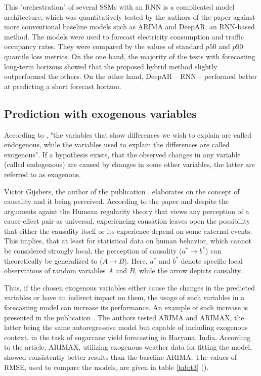 \documentclass[3p,times,procedia]{elsarticle}
\begin{document}
\begin{enumerate}
This "orchestration" of several SSMs with an RNN is a complicated model architecture, which was quantitatively tested by the authors of the paper \cite{rangapuram2018deep} against more conventional baseline models such as ARIMA and DeepAR, an RNN-based method. The models were used to forecast electricity consumption and traffic occupancy rates. They were compared by the values of standard $p50$ and $p90$ quantile loss metrics. On the one hand, the majority of the tests with forecasting long-term horizons showed that the proposed hybrid method slightly outperformed the others. On the other hand, DeepAR -- RNN -- performed better at predicting a short forecast horizon.
\end{enumerate}

\subsection{Prediction with exogenous variables} \label{pwev}

According to \cite{smelser2001international}, "the variables that show differences we wish to explain are called endogenous, while the variables used to explain the differences are  called exogenous". If a hypothesis exists, that the observed changes in any variable (called endogenous) are caused by changes in some other variables, the latter are referred to as exogenous.

Victor Gijsbers, the author of the publication \cite{gijsbers2021perceiving}, elaborates on the concept of causality and it being perceived. According to the paper and despite the arguments againt the Humean regularity theory that views any perception of a cause-effect pair as universal, experiencing causation leaves open the possibility that either the causality itself or its experience depend on some external events. This implies, that at least for statistical data on human behavior, which cannot be considered strongly local, the perception of causality ($a^* \to b^*$) can theoretically be generalized to ($A \to B$). Here, $a^*$ and $b^*$ denote specific local observations of random variables $A$ and $B$, while the arrow depicts causality.

Thus, if the chosen exogenous variables either cause the changes in the predicted variables or have an indirect impact on them, the usage of such variables in a forecasting model can increase its performance. An example of such increase is presented in the publication \cite{verma2022arima}. The authors tested ARIMA and ARIMAX, the latter being the same autoregressive model but capable of including exogenous context, in the task of sugarcane yield forecasting in Haryana, India. According to the article, ARIMAX, utilizing exogenous weather data for fitting the model, showed consistently better results than the baseline ARIMA. The values of RMSE, used to compare the models, are given in table \ref{tab:t3} (\cite{verma2022arima}).
\end{document}
